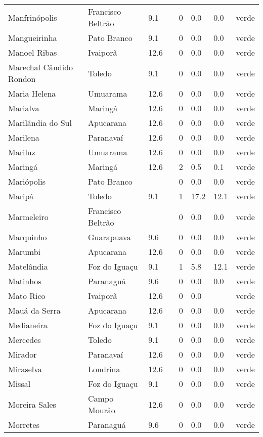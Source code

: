 \begin{longtable}{l|lllllll}
  Manfrinópolis & Francisco Beltrão & 9.1 &  & 0 & 0.0 & 0.0 & verde \\ 
  Mangueirinha & Pato Branco & 9.1 &  & 0 & 0.0 & 0.0 & verde \\ 
  Manoel Ribas & Ivaiporã & 12.6 &  & 0 & 0.0 & 0.0 & verde \\ 
  Marechal Cândido Rondon & Toledo & 9.1 &  & 0 & 0.0 & 0.0 & verde \\ 
  Maria Helena & Umuarama & 12.6 &  & 0 & 0.0 & 0.0 & verde \\ 
  Marialva & Maringá & 12.6 &  & 0 & 0.0 & 0.0 & verde \\ 
  Marilândia do Sul & Apucarana & 12.6 &  & 0 & 0.0 & 0.0 & verde \\ 
  Marilena & Paranavaí & 12.6 &  & 0 & 0.0 & 0.0 & verde \\ 
  Mariluz & Umuarama & 12.6 &  & 0 & 0.0 & 0.0 & verde \\ 
  Maringá & Maringá & 12.6 &  & 2 & 0.5 & 0.1 & verde \\ 
  Mariópolis & Pato Branco &  &  & 0 & 0.0 & 0.0 & verde \\ 
  Maripá & Toledo & 9.1 &  & 1 & 17.2 & 12.1 & verde \\ 
  Marmeleiro & Francisco Beltrão &  &  & 0 & 0.0 & 0.0 & verde \\ 
  Marquinho & Guarapuava & 9.6 &  & 0 & 0.0 & 0.0 & verde \\ 
  Marumbi & Apucarana & 12.6 &  & 0 & 0.0 & 0.0 & verde \\ 
  Matelândia & Foz do Iguaçu & 9.1 &  & 1 & 5.8 & 12.1 & verde \\ 
  Matinhos & Paranaguá & 9.6 &  & 0 & 0.0 & 0.0 & verde \\ 
  Mato Rico & Ivaiporã & 12.6 &  & 0 & 0.0 &  & verde \\ 
  Mauá da Serra & Apucarana & 12.6 &  & 0 & 0.0 & 0.0 & verde \\ 
  Medianeira & Foz do Iguaçu & 9.1 &  & 0 & 0.0 & 0.0 & verde \\ 
  Mercedes & Toledo & 9.1 &  & 0 & 0.0 & 0.0 & verde \\ 
  Mirador & Paranavaí & 12.6 &  & 0 & 0.0 & 0.0 & verde \\ 
  Miraselva & Londrina & 12.6 &  & 0 & 0.0 & 0.0 & verde \\ 
  Missal & Foz do Iguaçu & 9.1 &  & 0 & 0.0 & 0.0 & verde \\ 
  Moreira Sales & Campo Mourão & 12.6 &  & 0 & 0.0 & 0.0 & verde \\ 
  Morretes & Paranaguá & 9.6 &  & 0 & 0.0 & 0.0 & verde \\ 

\end{longtable}
